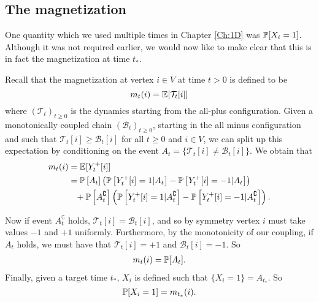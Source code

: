 \subsection{The magnetization}
One quantity which we used multiple times in Chapter \ref{Ch:1D} was $\mathbb{P}[X_i = 1]$. Although it was not required earlier, we would now like to make clear that this is in fact the magnetization at time $t_*$. 

Recall that the magnetization at vertex $i \in V$ at time $t > 0$ is defined to be
\begin{equation}
	m_t(i) = \mathbb{E}[\mathcal{T}_t[i]]
\end{equation}
where $(\mathcal{T}_t)_{t \geq 0}$ is the dynamics starting from the all-plus configuration. %
Given a monotonically coupled chain $(\mathcal{B}_t)_{t\geq0}$, starting in the all minus configuration and such that $\mathcal{T}_t[i] \geq \mathcal{B}_t[i]$ for all $t\geq 0$ and $i \in V$, we can split up this expectation by conditioning on the event $A_t = \{\mathcal{T}_t[i] \neq \mathcal{B}_t[i]\}$. We obtain that
\begin{align}
	m_t(i) &= \mathbb{E}[Y_t^+[i]]\\
	&= \mathbb{P}\left[A_t\right] \left(\mathbb{P}\left[Y_t^+[i] = 1 | A_t\right] - \mathbb{P}\left[Y_t^+[i] = -1|A_t\right]\right)  \\
	&\phantom{= } + \mathbb{P}\left[A_t^\complement\right] \left( \mathbb{P}\left[Y_t^+[i] = 1 |A_t^\complement\right] - \mathbb{P}\left[Y_t^+[i] = -1|A_t^\complement\right] \right). \notag
\end{align}

Now if event $A_t^\complement$ holds, $\mathcal{T}_t[i] = \mathcal{B}_t[i]$, and so by symmetry vertex $i$ must take values $-1$ and $+1$ uniformly. Furthermore, by the monotonicity of our coupling, if $A_t$ holds, we must have that $\mathcal{T}_t[i] = +1$ and $\mathcal{B}_t[i] = -1$.
So
\begin{align}
	m_t(i) = \mathbb{P}[A_t].
\end{align}
Finally, given a target time $t_*$, $X_i$ is defined such that $\{X_i = 1\} = A_{t_*}$. So 
\begin{equation}
	\label{eq:prob X_i = 1 is m_t*}
	\mathbb{P}[X_i = 1] = m_{t_*}(i).	
\end{equation}


